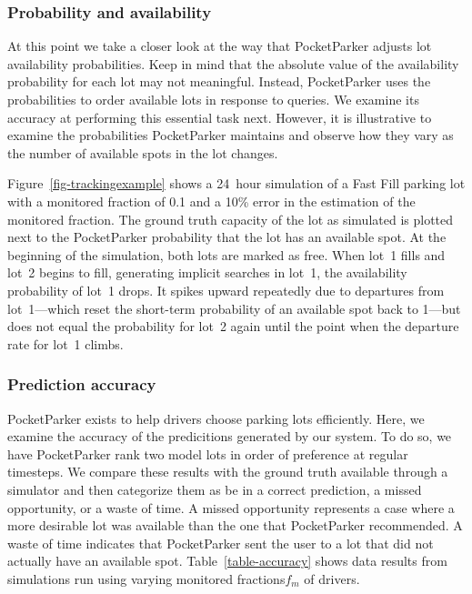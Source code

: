 \subsubsection{Probability and availability}

At this point we take a closer look at the way that PocketParker adjusts lot
availability probabilities. Keep in mind that the absolute value of the
availability probability for each lot may not meaningful. Instead,
PocketParker uses the probabilities to order available lots in response to
queries. We examine its accuracy at performing this essential task next.
However, it is illustrative to examine the probabilities PocketParker
maintains and observe how they vary as the number of available spots in the
lot changes.

Figure~\ref{fig-trackingexample} shows a 24~hour simulation of a Fast Fill
parking lot with a monitored fraction of 0.1 and a 10\% error in the
estimation of the monitored fraction. The ground truth capacity of the lot as
simulated is plotted next to the PocketParker probability that the lot has an
available spot. At the beginning of the simulation, both lots are marked as
free. When lot~1 fills and lot~2 begins to fill, generating implicit searches
in lot~1, the availability probability of lot~1 drops. It spikes upward
repeatedly due to departures from lot~1---which reset the short-term
probability of an available spot back to 1---but does not equal the
probability for lot~2 again until the point when the departure rate for lot~1
climbs.

\subsubsection{Prediction accuracy}




PocketParker exists to help drivers choose parking lots efficiently. Here,
we examine the accuracy of the predicitions generated by our system. To do
so, we have PocketParker rank two model lots in order of preference at
regular timesteps.  We compare these results with the ground truth available
through a simulator and then categorize them as be in a correct prediction,
a missed opportunity, or a waste of time. A missed opportunity represents a
case where a more desirable lot was available than the one that PocketParker
recommended. A waste of time indicates that PocketParker sent the user to a
lot that did not actually have an available spot. Table~\ref{table-accuracy}
shows data results from simulations run using varying monitored
fractions$f_m$ of drivers.

